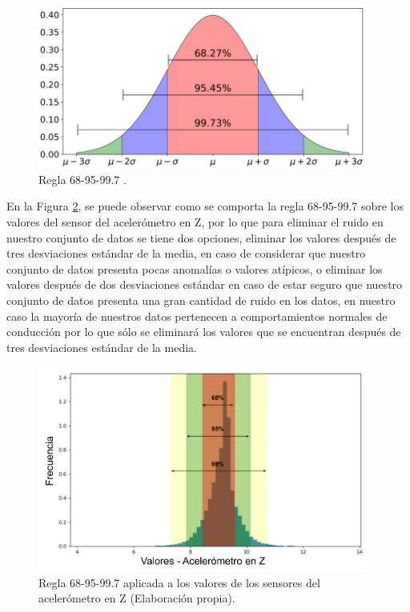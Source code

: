 \begin{figure}[h!]
  \begin{center}	\includegraphics[width=0.97\textwidth,frame]{imagenes/Cap3/68-95-99_rule}
  \caption{Regla 68-95-99.7 \protect\cite{Reference74}.}
  \label{fig:689599rule}
  \end{center}
\end{figure}

En la Figura \ref{fig:689599rule_acc_z}, se puede observar como se comporta la regla 68-95-99.7 sobre los valores del sensor del aceler\'{o}metro en Z, por lo que para eliminar el ruido en nuestro conjunto de datos se tiene dos opciones, eliminar los valores despu\'{e}s de tres desviaciones est\'{a}ndar de la media, en caso de considerar que nuestro conjunto de datos presenta pocas anomal\'{i}as o valores at\'{i}picos, o eliminar los valores despu\'{e}s de dos desviaciones est\'{a}ndar en caso de estar seguro que nuestro conjunto de datos presenta una gran cantidad de ruido en los datos, en nuestro caso la mayor\'{i}a de nuestros datos pertenecen a comportamientos normales de conducci\'{o}n por lo que s\'{o}lo se eliminar\'{a} los valores que se encuentran despu\'{e}s de tres desviaciones est\'{a}ndar de la media.


\begin{figure}[h!]
  \begin{center}	\includegraphics[width=0.97\textwidth,frame]{imagenes/Cap3/68-95-99_rule_acc_z}
  \caption{Regla 68-95-99.7 aplicada a los valores de los sensores del aceler\'{o}metro en Z (Elaboraci\'{o}n propia). }
  \label{fig:689599rule_acc_z}
  \end{center}
\end{figure}

